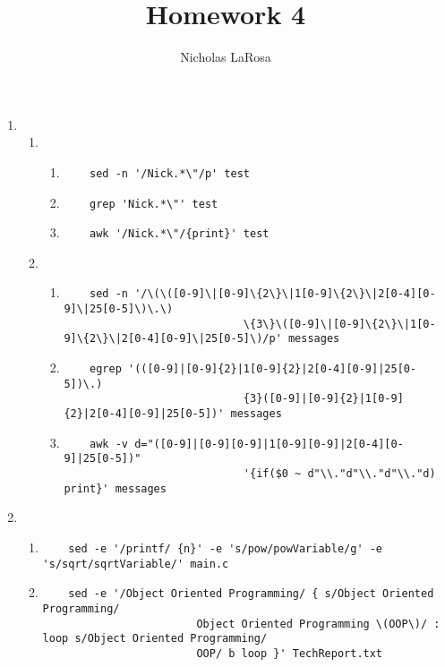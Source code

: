 \documentclass{article}
\title{Homework 4}
\author{Nicholas LaRosa}
\begin{document}
\maketitle

\begin{enumerate}
\item
	\begin{enumerate}
	\item 		
		\begin{enumerate}	
			\item	\begin{verbatim}	sed -n '/Nick.*\"/p' test	\end{verbatim}
			\item	\begin{verbatim}	grep 'Nick.*\"' test		\end{verbatim}
			\item	\begin{verbatim}	awk '/Nick.*\"/{print}' test	\end{verbatim}
		\end{enumerate}
	\item		
		\begin{enumerate}
			\item	\begin{verbatim}	sed -n '/\(\([0-9]\|[0-9]\{2\}\|1[0-9]\{2\}\|2[0-4][0-9]\|25[0-5]\)\.\)
							\{3\}\([0-9]\|[0-9]\{2\}\|1[0-9]\{2\}\|2[0-4][0-9]\|25[0-5]\)/p' messages	\end{verbatim}
			\item	\begin{verbatim}	egrep '(([0-9]|[0-9]{2}|1[0-9]{2}|2[0-4][0-9]|25[0-5])\.)
							{3}([0-9]|[0-9]{2}|1[0-9]{2}|2[0-4][0-9]|25[0-5])' messages			\end{verbatim}
			\item	\begin{verbatim}	awk -v d="([0-9]|[0-9][0-9]|1[0-9][0-9]|2[0-4][0-9]|25[0-5])" 
							'{if($0 ~ d"\\."d"\\."d"\\."d) print}' messages					\end{verbatim}
		\end{enumerate}
	\end{enumerate}

\item  
	\begin{enumerate}
		\item	\begin{verbatim}	sed -e '/printf/ {n}' -e 's/pow/powVariable/g' -e 's/sqrt/sqrtVariable/' main.c		\end{verbatim}
		\item	\begin{verbatim}	sed -e '/Object Oriented Programming/ { s/Object Oriented Programming/
						Object Oriented Programming \(OOP\)/ : loop s/Object Oriented Programming/
						OOP/ b loop }' TechReport.txt								\end{verbatim}
	\end{enumerate}


\end{enumerate}
\end{document}
